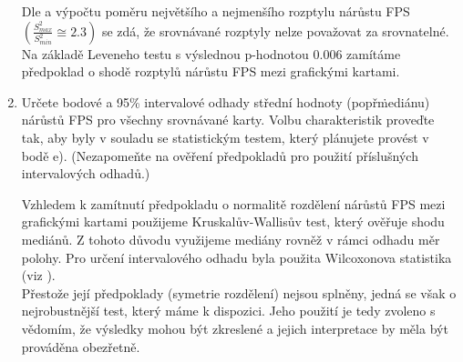 \begin{enumerate}[label=\alph*)]
    \vspace{1em}
    \begin{minipage}{0.94\textwidth}
        Dle  a výpočtu poměru největšího a nejmenšího rozptylu nárůstu FPS $(\frac{S^2_{max}}{S^2_{min}} \cong 2.3)$ se zdá, že srovnávané rozptyly nelze považovat za srovnatelné. \\

        Na základě Leveneho testu s výslednou p-hodnotou $0.006$ zamítáme předpoklad o shodě rozptylů nárůstu FPS mezi grafickými kartami.
    \end{minipage}
    
    \newpage
    \item Určete bodové a 95\% intervalové odhady střední hodnoty (popř\. mediánu) nárůstů FPS pro všechny srovnávané karty.
    Volbu charakteristik proveďte tak, aby byly v souladu se statistickým testem, který plánujete provést v bodě e). 
    (Nezapomeňte na ověření předpokladů pro použití příslušných intervalových odhadů.)

    \vspace{1em}
    \begin{minipage}{0.94\textwidth}
        Vzhledem k zamítnutí předpokladu o normalitě rozdělení nárůstů FPS mezi grafickými kartami použijeme Kruskalův-Wallisův test, který ověřuje shodu mediánů.
        Z tohoto důvodu využijeme mediány rovněž v rámci odhadu měr polohy.
        Pro určení intervalového odhadu byla použita Wilcoxonova statistika (viz ). \\

        Přestože její předpoklady (symetrie rozdělení) nejsou splněny, jedná se však o nejrobustnější test, který máme k dispozici.
        Jeho použití je tedy zvoleno s vědomím, že výsledky mohou být zkreslené a jejich interpretace by měla být prováděna obezřetně.


\end{minipage}
\end{enumerate}
